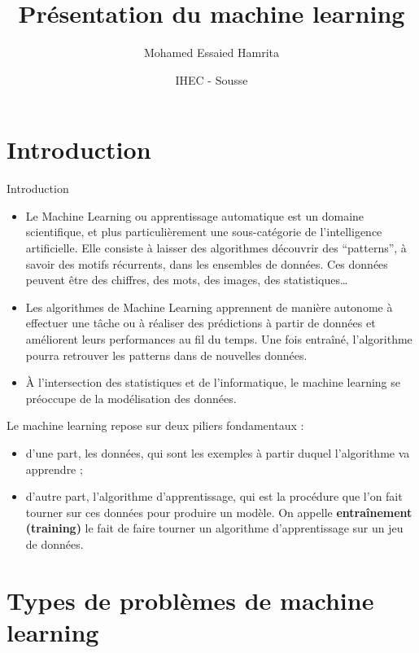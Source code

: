 \documentclass[
  10pt,
  ignorenonframetext,
]{beamer}
\title{Présentation du machine learning}
\author{Mohamed Essaied Hamrita}
\date{IHEC - Sousse}
\begin{document}
\frame{\titlepage}

\begin{frame}[allowframebreaks]
  \tableofcontents[hideallsubsections]
\end{frame}
\hypertarget{introduction}{%
\section{Introduction}\label{introduction}}

\begin{frame}{Introduction}
\begin{itemize}
\item
  Le Machine Learning ou apprentissage automatique est un domaine
  scientifique, et plus particulièrement une sous-catégorie de
  l'intelligence artificielle. Elle consiste à laisser des algorithmes
  découvrir des ``patterns'', à savoir des motifs récurrents, dans les
  ensembles de données. Ces données peuvent être des chiffres, des mots,
  des images, des statistiques\ldots
\item
  Les algorithmes de Machine Learning apprennent de manière autonome à
  effectuer une tâche ou à réaliser des prédictions à partir de données
  et améliorent leurs performances au fil du temps. Une fois entraîné,
  l'algorithme pourra retrouver les patterns dans de nouvelles données.
\item
  À l'intersection des statistiques et de l'informatique, le machine
  learning se préoccupe de la modélisation des données.
\end{itemize}
\end{frame}

\begin{frame}
Le machine learning repose sur deux piliers fondamentaux :

\begin{itemize}
\item
  d'une part, les données, qui sont les exemples à partir duquel
  l'algorithme va apprendre ;
\item
  d'autre part, l'algorithme d'apprentissage, qui est la procédure que
  l'on fait tourner sur ces données pour produire un modèle. On appelle
  \textbf{entraînement (training)} le fait de faire tourner un
  algorithme d'apprentissage sur un jeu de données.
\end{itemize}
\end{frame}

\hypertarget{types-de-probluxe8mes-de-machine-learning}{%
\section{Types de problèmes de machine
learning}\label{types-de-probluxe8mes-de-machine-learning}}
\end{document}
